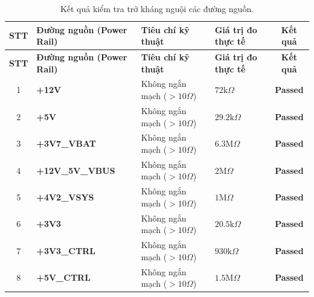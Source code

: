         \begin{longtable}{|c|p{4cm}|p{5cm}|p{3cm}|c|}
            \caption{Kết quả kiểm tra trở kháng nguội các đường nguồn.}
            \label{tab:cold_check_results} \\
            \hline
            \textbf{STT} & \textbf{Đường nguồn (Power Rail)} & \textbf{Tiêu chí kỹ thuật} & \textbf{Giá trị đo thực tế} & \textbf{Kết quả} \\ \hline
            \endfirsthead
            \hline
            \textbf{STT} & \textbf{Đường nguồn (Power Rail)} & \textbf{Tiêu chí kỹ thuật} & \textbf{Giá trị đo thực tế} & \textbf{Kết quả} \\ \hline
            \endhead
            \hline
            \endfoot
            \endlastfoot

            1 & \textbf{+12V} & Không ngắn mạch ($> 10\Omega$) & $72\text{k}\Omega$ & \textcolor{modern_blue}{\textbf{Passed}} \\ \hline

            2 & \textbf{+5V} & Không ngắn mạch ($> 10\Omega$) & $29.2\text{k}\Omega$ & \textcolor{modern_blue}{\textbf{Passed}} \\ \hline
            
            3 & \textbf{+3V7\_VBAT} & Không ngắn mạch ($> 10\Omega$) & $6.3\text{M}\Omega$ & \textcolor{modern_blue}{\textbf{Passed}} \\ \hline
            
            4 & \textbf{+12V\_5V\_VBUS} & Không ngắn mạch ($> 10\Omega$) & $2\text{M}\Omega$ & \textcolor{modern_blue}{\textbf{Passed}} \\ \hline
            
            5 & \textbf{+4V2\_VSYS} & Không ngắn mạch ($> 10\Omega$) & $1\text{M}\Omega$ & \textcolor{modern_blue}{\textbf{Passed}} \\ \hline
            
            6 & \textbf{+3V3} & Không ngắn mạch ($> 10\Omega$) & $20.5\text{k}\Omega$ & \textcolor{modern_blue}{\textbf{Passed}} \\ \hline
            
            7 & \textbf{+3V3\_CTRL} & Không ngắn mạch ($> 10\Omega$) & $930\text{k}\Omega$ & \textcolor{modern_blue}{\textbf{Passed}} \\ \hline
            
            8 & \textbf{+5V\_CTRL} & Không ngắn mạch ($> 10\Omega$) & $1.5\text{M}\Omega$ & \textcolor{modern_blue}{\textbf{Passed}} \\ \hline
        \end{longtable}

